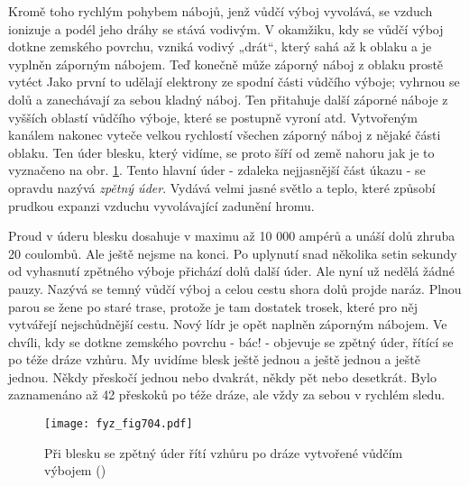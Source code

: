     Kromě toho rychlým pohybem nábojů, jenž vůdčí výboj vyvolává, se vzduch ionizuje a podél jeho
    dráhy se stává vodivým. V okamžiku, kdy se vůdčí výboj dotkne zemského povrchu, vzniká vodivý
    „drát“, který sahá až k oblaku a je vyplněn záporným nábojem. Teď konečně může záporný náboj z
    oblaku prostě vytéct Jako první to udělají elektrony ze spodní části vůdčího výboje; vyhrnou se
    dolů a zanechávají za sebou kladný náboj. Ten přitahuje další záporné náboje z vyšších oblastí
    vůdčího výboje, které se postupně vyroní atd. Vytvořeným kanálem nakonec vyteče velkou rychlostí
    všechen záporný náboj z nějaké části oblaku. Ten úder blesku, který vidíme, se proto šíří od
    země nahoru jak je to vyznačeno na obr. \ref{fyz:fig704}. Tento hlavní úder - zdaleka
    nejjasnější část úkazu - se opravdu nazývá \emph{zpětný úder}. Vydává velmi jasné světlo a
    teplo, které způsobí prudkou expanzi vzduchu vyvolávající zadunění hromu.

    Proud v úderu blesku dosahuje v maximu až 10 000 ampérů a unáší dolů zhruba 20 coulombů. Ale
    ještě nejsme na konci. Po uplynutí snad několika setin sekundy od vyhasnutí zpětného výboje
    přichází dolů další úder. Ale nyní už nedělá žádné pauzy. Nazývá se temný vůdčí výboj a celou
    cestu shora dolů projde naráz. Plnou parou se žene po staré trase, protože je tam dostatek
    trosek, které pro něj vytvářejí nejschůdnější cestu. Nový lídr je opět naplněn záporným nábojem.
    Ve chvíli, kdy se dotkne zemského povrchu - bác! - objevuje se zpětný úder, řítící se po téže
    dráze vzhůru. My uvidíme blesk ještě jednou a ještě jednou a ještě jednou. Někdy přeskočí jednou
    nebo dvakrát, někdy pět nebo desetkrát. Bylo zaznamenáno až 42 přeskoků po téže dráze, ale vždy
    za sebou v rychlém sledu.

    \begin{figure}[ht!] %
      \centering
      \texttt{[image: fyz\_fig704.pdf]}
      \caption{Při blesku se zpětný úder řítí vzhůru po dráze vytvořené vůdčím výbojem
               (\cite[s.~707]{Feynman02})}
      \label{fyz:fig704}
    \end{figure}

